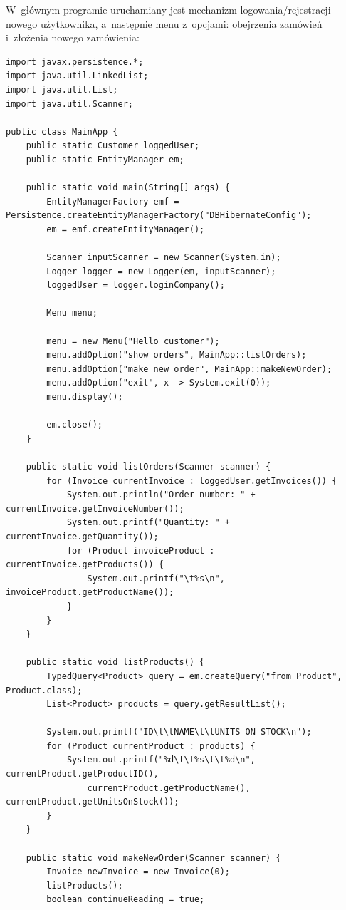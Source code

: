 \documentclass[12pt, a4paper]{mwart}
\begin{document}
W~głównym programie uruchamiany jest mechanizm logowania/rejestracji nowego użytkownika, a~następnie menu z~opcjami: obejrzenia zamówień i~złożenia nowego zamówienia:
\begin{lstlisting}
import javax.persistence.*;
import java.util.LinkedList;
import java.util.List;
import java.util.Scanner;

public class MainApp {
    public static Customer loggedUser;
    public static EntityManager em;

    public static void main(String[] args) {
        EntityManagerFactory emf = Persistence.createEntityManagerFactory("DBHibernateConfig");
        em = emf.createEntityManager();

        Scanner inputScanner = new Scanner(System.in);
        Logger logger = new Logger(em, inputScanner);
        loggedUser = logger.loginCompany();

        Menu menu;

        menu = new Menu("Hello customer");
        menu.addOption("show orders", MainApp::listOrders);
        menu.addOption("make new order", MainApp::makeNewOrder);
        menu.addOption("exit", x -> System.exit(0));
        menu.display();

        em.close();
    }

    public static void listOrders(Scanner scanner) {
        for (Invoice currentInvoice : loggedUser.getInvoices()) {
            System.out.println("Order number: " + currentInvoice.getInvoiceNumber());
            System.out.printf("Quantity: " + currentInvoice.getQuantity());
            for (Product invoiceProduct : currentInvoice.getProducts()) {
                System.out.printf("\t%s\n", invoiceProduct.getProductName());
            }
        }
    }

    public static void listProducts() {
        TypedQuery<Product> query = em.createQuery("from Product", Product.class);
        List<Product> products = query.getResultList();

        System.out.printf("ID\t\tNAME\t\tUNITS ON STOCK\n");
        for (Product currentProduct : products) {
            System.out.printf("%d\t\t%s\t\t%d\n", currentProduct.getProductID(), 
            	currentProduct.getProductName(), currentProduct.getUnitsOnStock());
        }
    }

    public static void makeNewOrder(Scanner scanner) {
        Invoice newInvoice = new Invoice(0);
        listProducts();
        boolean continueReading = true;


\end{lstlisting}
\end{document}
